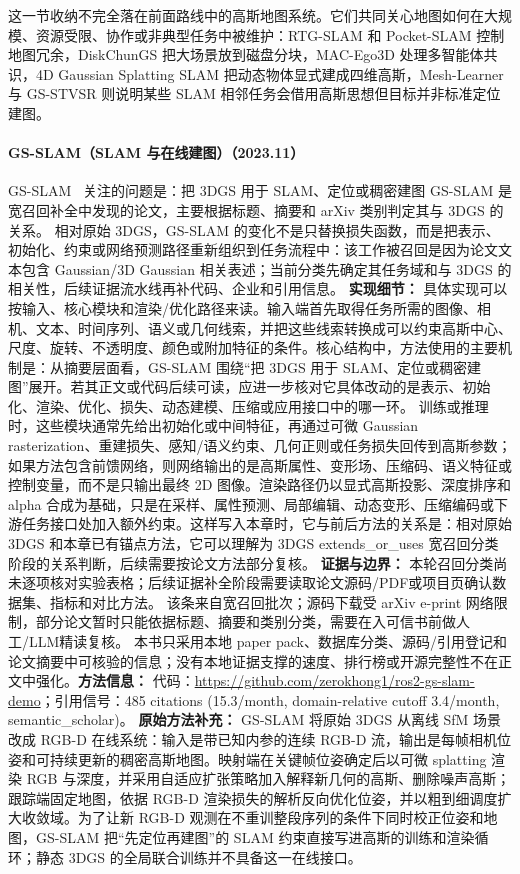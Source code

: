 这一节收纳不完全落在前面路线中的高斯地图系统。它们共同关心地图如何在大规模、资源受限、协作或非典型任务中被维护：RTG-SLAM 和 Pocket-SLAM 控制地图冗余，DiskChunGS 把大场景放到磁盘分块，MAC-Ego3D 处理多智能体共识，4D Gaussian Splatting SLAM 把动态物体显式建成四维高斯，Mesh-Learner 与 GS-STVSR 则说明某些 SLAM 相邻任务会借用高斯思想但目标并非标准定位建图。
\paragraph{GS-SLAM（SLAM 与在线建图）（2023.11）}
GS-SLAM~\cite{2311_11700} 关注的问题是：把 3DGS 用于 SLAM、定位或稠密建图 GS-SLAM 是宽召回补全中发现的论文，主要根据标题、摘要和 arXiv 类别判定其与 3DGS 的关系。
相对原始 3DGS，GS-SLAM 的变化不是只替换损失函数，而是把表示、初始化、约束或网络预测路径重新组织到任务流程中：该工作被召回是因为论文文本包含 Gaussian/3D Gaussian 相关表述；当前分类先确定其任务域和与 3DGS 的相关性，后续证据流水线再补代码、企业和引用信息。
\textbf{实现细节：} 具体实现可以按输入、核心模块和渲染/优化路径来读。输入端首先取得任务所需的图像、相机、文本、时间序列、语义或几何线索，并把这些线索转换成可以约束高斯中心、尺度、旋转、不透明度、颜色或附加特征的条件。核心结构中，方法使用的主要机制是：从摘要层面看，GS-SLAM 围绕“把 3DGS 用于 SLAM、定位或稠密建图”展开。若其正文或代码后续可读，应进一步核对它具体改动的是表示、初始化、渲染、优化、损失、动态建模、压缩或应用接口中的哪一环。 训练或推理时，这些模块通常先给出初始化或中间特征，再通过可微 Gaussian rasterization、重建损失、感知/语义约束、几何正则或任务损失回传到高斯参数；如果方法包含前馈网络，则网络输出的是高斯属性、变形场、压缩码、语义特征或控制变量，而不是只输出最终 2D 图像。渲染路径仍以显式高斯投影、深度排序和 alpha 合成为基础，只是在采样、属性预测、局部编辑、动态变形、压缩编码或下游任务接口处加入额外约束。这样写入本章时，它与前后方法的关系是：相对原始 3DGS 和本章已有锚点方法，它可以理解为 3DGS extends\_or\_uses 宽召回分类阶段的关系判断，后续需要按论文方法部分复核。
\textbf{证据与边界：} 本轮召回分类尚未逐项核对实验表格；后续证据补全阶段需要读取论文源码/PDF或项目页确认数据集、指标和对比方法。 该条来自宽召回批次；源码下载受 arXiv e-print 网络限制，部分论文暂时只能依据标题、摘要和类别分类，需要在入可信书前做人工/LLM精读复核。 本书只采用本地 paper pack、数据库分类、源码/引用登记和论文摘要中可核验的信息；没有本地证据支撑的速度、排行榜或开源完整性不在正文中强化。\textbf{方法信息：} 代码：\url{https://github.com/zerokhong1/ros2-gs-slam-demo}；引用信号：485 citations (15.3/month, domain-relative cutoff 3.4/month, semantic\_scholar)。
\textbf{原始方法补充：} GS-SLAM 将原始 3DGS 从离线 SfM 场景改成 RGB-D 在线系统：输入是带已知内参的连续 RGB-D 流，输出是每帧相机位姿和可持续更新的稠密高斯地图。映射端在关键帧位姿确定后以可微 splatting 渲染 RGB 与深度，并采用自适应扩张策略加入解释新几何的高斯、删除噪声高斯；跟踪端固定地图，依据 RGB-D 渲染损失的解析反向优化位姿，并以粗到细调度扩大收敛域。为了让新 RGB-D 观测在不重训整段序列的条件下同时校正位姿和地图，GS-SLAM 把“先定位再建图”的 SLAM 约束直接写进高斯的训练和渲染循环；静态 3DGS 的全局联合训练并不具备这一在线接口。
